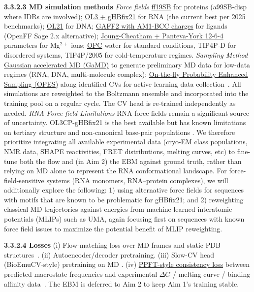 \documentclass[11pt]{article}
\begin{document}
\textbf{3.3.2.3 MD simulation methods} \emph{Force fields} \uline{ff19SB} for proteins (a99SB-disp where IDRs are involved); \uline{OL3 + gHBfix21} for RNA (the current best per 2025 benchmarks); \uline{OL21} for DNA; \uline{GAFF2 with AM1-BCC charges} for ligands (OpenFF Sage 2.x alternative); \uline{Joung-Cheatham + Panteva-York 12-6-4} parameters for Mg$^{2+}$ ions; \uline{OPC} water for standard conditions, TIP4P-D for disordered systems, TIP4P/2005 for cold-temperature regimes. \emph{Sampling Method} \uline{Gaussian accelerated MD (GaMD)} \cite{copeland_Gaussian_2022} to generate preliminary MD data for low-data regimes (RNA, DNA, multi-molecule complex); \uline{On-the-fly Probability Enhanced Sampling (OPES)} along identified CVs for active learning data collection~\cite{mehdi_Enhanced_2024}. All simulations are reweighted to the Boltzmann ensemble and incorporated into the training pool on a regular cycle. The CV head is re-trained independently as needed. \emph{RNA Force-field Limitations} RNA force fields remain a significant source of uncertainty. OL3CP-gHBfix21 is the best available but has known limitations on tertiary structure and non-canonical base-pair populations \cite{mlýnský_Can_2025}. We therefore prioritize integrating all available experimental data (cryo-EM class populations, NMR data, SHAPE reactivities, FRET distributions, melting curves, etc) to fine-tune both the flow and (in Aim 2) the EBM against ground truth, rather than relying on MD alone to represent the RNA conformational landscape. For force-field-sensitive systems (RNA monomers, RNA--protein complexes), we will additionally explore the following: 1) using alternative force fields for sequences with motifs that are known to be problematic for gHBfix21; and 2) reweighting classical-MD trajectories against energies from machine-learned interatomic potentials (MLIPs) such as UMA, again focusing first on sequences with known force field issues to maximize the potential benefit of MLIP reweighting.

\textbf{3.3.2.4 Losses} (i) Flow-matching loss over MD frames and static PDB structures~\cite{geffner_LaProteina_2025, lewis_Scalable_2025,dinh_Compressing_2026}. (ii) Autoencoder/decoder pretraining. (iii) Slow-CV head (BioEmuCV-style) pretraining on MD \cite{park_Learning_2026}. (iv) \uline{PPFT-style consistency loss} between predicted macrostate frequencies and experimental $\Delta G$ / melting-curve / binding affinity data~\cite{lewis_Scalable_2025}. The EBM is deferred to Aim 2 to keep Aim 1's training stable.
\end{document}
